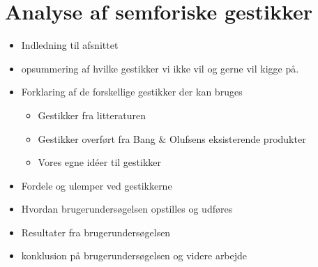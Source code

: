 \chapter{Analyse af semforiske gestikker}
\label{AnalyseAfSemaforiskeGestikker}
%

\begin{itemize}
  \item Indledning til afsnittet
  \item opsummering af hvilke gestikker vi ikke vil og gerne vil kigge på.
  \item Forklaring af de forskellige gestikker der kan bruges
  \begin{itemize}
  	\item Gestikker fra litteraturen
  	\item Gestikker overført fra Bang $\&$ Olufsens eksisterende produkter
  	\item Vores egne idéer til gestikker
  \end{itemize}
  \item Fordele og ulemper ved gestikkerne
  \item Hvordan brugerundersøgelsen opstilles og udføres
  \item Resultater fra brugerundersøgelsen
  \item konklusion på brugerundersøgelsen og videre arbejde
\end{itemize}


